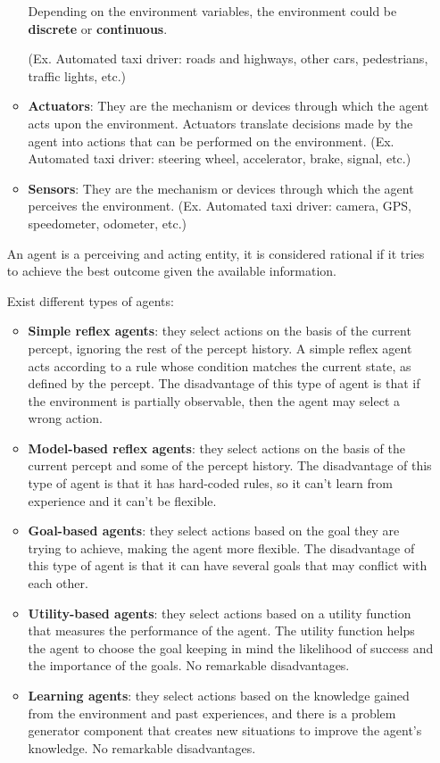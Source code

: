 \documentclass[12pt]{article}
\begin{document}
\begin{enumerate}[label=\textbf{A.\arabic*}]
\begin{itemize}
        Depending on the environment variables, the environment could be \textbf{discrete} or \textbf{continuous}.
        
        (Ex. Automated taxi driver: roads and highways, other cars, pedestrians, traffic lights, etc.)
        \item \textbf{Actuators}: They are the mechanism or devices through which the agent acts upon the environment.
        Actuators translate decisions made by the agent into actions that can be performed on the environment.
        (Ex. Automated taxi driver: steering wheel, accelerator, brake, signal, etc.)
        \item \textbf{Sensors}: They are the mechanism or devices through which the agent perceives the environment.
        (Ex. Automated taxi driver: camera, GPS, speedometer, odometer, etc.)
    \end{itemize}
    An agent is a perceiving and acting entity, it is considered rational if it tries to achieve the best outcome given the available information.

    Exist different types of agents:
    \begin{itemize}
        \item \textbf{Simple reflex agents}: they select actions on the basis of the current percept, 
        ignoring the rest of the percept history.
        A simple reflex agent acts according to a rule whose condition matches the current state, as defined by the percept.
        The disadvantage of this type of agent is that if the environment is partially observable, then the agent may select a wrong action.

        \item \textbf{Model-based reflex agents}: they select actions on the basis of 
        the current percept and some of the percept history.
        The disadvantage of this type of agent is that it has hard-coded rules, so it can't learn from experience and it can't be flexible.

        \item \textbf{Goal-based agents}: they select actions based on the goal they are trying to achieve, 
        making the agent more flexible.
        The disadvantage of this type of agent is that it can have several goals that may conflict with each other.
        
        \item \textbf{Utility-based agents}: they select actions based on a utility function that measures the performance of the agent.
        The utility function helps the agent to choose the goal keeping in mind the likelihood of success and the importance of the goals.
        No remarkable disadvantages.

        \item \textbf{Learning agents}: they select actions based on the knowledge gained from the environment and past experiences, and there is a problem generator
        component that creates new situations to improve the agent's knowledge.
        No remarkable disadvantages.
    \end{itemize}
\end{enumerate}
\end{document}
